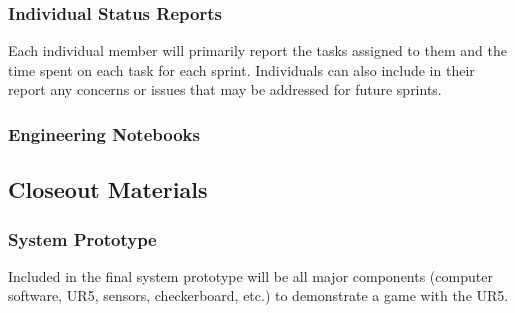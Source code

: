 
\subsubsection{Individual Status Reports}
Each individual member will primarily report the tasks assigned to them and the time spent on each task for each sprint. Individuals can also include in their report any concerns or issues that may be addressed for future sprints.


\subsubsection{Engineering Notebooks}


\subsection{Closeout Materials}
\subsubsection{System Prototype}
Included in the final system prototype will be all major components (computer software, UR5, sensors, checkerboard, etc.) to demonstrate a game with the UR5.


